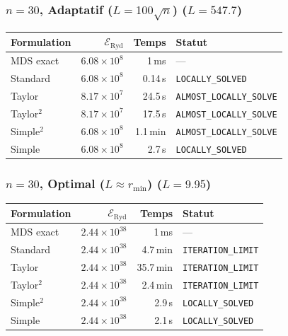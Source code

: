 \subsubsection{$n=30$, Adaptatif ($L{=}100\sqrt{n}$) ($L=547.7$)}
\begin{longtable}{@{}lrrl@{}}
  \toprule
  Formulation & $\mathcal{E}_{\mathrm{Ryd}}$ & Temps & Statut \\
  \midrule
  \endhead
  MDS exact & $6.08\times10^{8}$ & 1\,ms & --- \\
  Standard & $6.08\times10^{8}$ & 0.14\,s & \texttt{LOCALLY\_SOLVED} \\
  Taylor & $8.17\times10^{7}$ & 24.5\,s & \texttt{ALMOST\_LOCALLY\_SOLVE} \\
  Taylor$^2$ & $8.17\times10^{7}$ & 17.5\,s & \texttt{ALMOST\_LOCALLY\_SOLVE} \\
  Simple$^2$ & $6.08\times10^{8}$ & 1.1\,min & \texttt{ALMOST\_LOCALLY\_SOLVE} \\
  Simple & $6.08\times10^{8}$ & 2.7\,s & \texttt{LOCALLY\_SOLVED} \\
  \bottomrule
\end{longtable}

\subsubsection{$n=30$, Optimal ($L{\approx}r_{\min}$) ($L=9.95$)}
\begin{longtable}{@{}lrrl@{}}
  \toprule
  Formulation & $\mathcal{E}_{\mathrm{Ryd}}$ & Temps & Statut \\
  \midrule
  \endhead
  MDS exact & $2.44\times10^{38}$ & 1\,ms & --- \\
  Standard & $2.44\times10^{38}$ & 4.7\,min & \texttt{ITERATION\_LIMIT} \\
  Taylor & $2.44\times10^{38}$ & 35.7\,min & \texttt{ITERATION\_LIMIT} \\
  Taylor$^2$ & $2.44\times10^{38}$ & 2.4\,min & \texttt{ITERATION\_LIMIT} \\
  Simple$^2$ & $2.44\times10^{38}$ & 2.9\,s & \texttt{LOCALLY\_SOLVED} \\
  Simple & $2.44\times10^{38}$ & 2.1\,s & \texttt{LOCALLY\_SOLVED} \\
  \bottomrule
\end{longtable}

